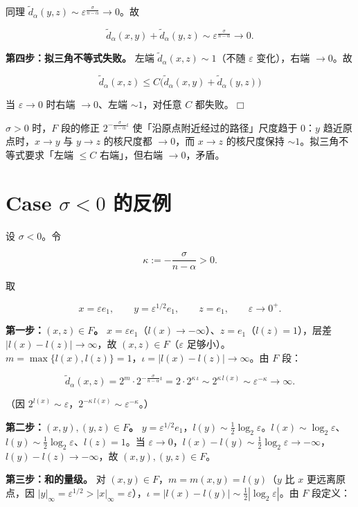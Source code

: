 \documentclass[a4paper,11pt,openany]{ctexbook}
\numberwithin{equation}{chapter}
\numberwithin{figure}{chapter}
\numberwithin{table}{chapter}
\begin{document}
同理 $\widetilde d_\alpha(y,z)\sim\varepsilon^{\frac{\sigma}{n-\alpha}}\to0$。故

$$\widetilde d_\alpha(x,y)+\widetilde d_\alpha(y,z)\sim\varepsilon^{\frac{\sigma}{n-\alpha}}\to0.$$

\textbf{第四步：拟三角不等式失败。} 左端 $\widetilde d_\alpha(x,z)\sim1$（不随 $\varepsilon$ 变化），右端 $\to0$。故

$$\widetilde d_\alpha(x,z)\le C\bigl(\widetilde d_\alpha(x,y)+\widetilde d_\alpha(y,z)\bigr)$$

当 $\varepsilon\to0$ 时右端 $\to0$、左端 $\sim1$，对任意 $C$ 都失败。$\Box$

\begin{intuitionbox}
$\sigma>0$ 时，$F$ 段的修正 $2^{-\frac{\sigma}{n-\alpha}\iota}$ 使「沿原点附近经过的路径」尺度趋于 $0$：$y$ 趋近原点时，$x\to y$ 与 $y\to z$ 的核尺度都 $\to0$，而 $x\to z$ 的核尺度保持 $\sim1$。拟三角不等式要求「左端 $\le C$ 右端」，但右端 $\to0$，矛盾。
\end{intuitionbox}

\section{Case $\sigma<0$ 的反例}

设 $\sigma<0$。令

$$\kappa:=-\frac{\sigma}{n-\alpha}>0.$$

取

$$x=\varepsilon e_1,\qquad y=\varepsilon^{1/2}e_1,\qquad z=e_1,\qquad\varepsilon\to0^+.$$

\textbf{第一步：$(x,z)\in F$。} $x=\varepsilon e_1$（$l(x)\to-\infty$）、$z=e_1$（$l(z)=1$），层差 $|l(x)-l(z)|\to\infty$，故 $(x,z)\in F$（$\varepsilon$ 足够小）。$m=\max\{l(x),l(z)\}=1$，$\iota=|l(x)-l(z)|\to\infty$。由 $F$ 段：

$$\widetilde d_\alpha(x,z)=2^m\cdot2^{-\frac{\sigma}{n-\alpha}\iota}=2\cdot2^{\kappa\,\iota}\sim2^{\kappa\,l(x)}\sim\varepsilon^{-\kappa}\to\infty.$$

（因 $2^{l(x)}\sim\varepsilon$，$2^{-\kappa\,l(x)}\sim\varepsilon^{-\kappa}$。）

\textbf{第二步：$(x,y),(y,z)\in F$。} $y=\varepsilon^{1/2}e_1$，$l(y)\sim\frac12\log_2\varepsilon$。$l(x)\sim\log_2\varepsilon$、$l(y)\sim\frac12\log_2\varepsilon$、$l(z)=1$。当 $\varepsilon\to0$，$l(x)-l(y)\sim\frac12\log_2\varepsilon\to-\infty$，$l(y)-l(z)\to-\infty$，故 $(x,y),(y,z)\in F$。

\textbf{第三步：和的量级。} 对 $(x,y)\in F$，$m=m(x,y)=l(y)$（$y$ 比 $x$ 更远离原点，因 $|y|_\infty=\varepsilon^{1/2}>|x|_\infty=\varepsilon$），$\iota=|l(x)-l(y)|\sim\frac12|\log_2\varepsilon|$。由 $F$ 段定义：
\end{document}
